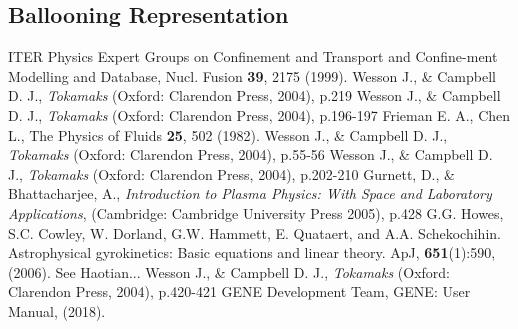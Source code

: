 \documentclass[12pt]{article}
\numberwithin{equation}{subsection}
\begin{document}
\subsection{Ballooning Representation}

\newpage{}

\begin{thebibliography}{0}
   
    ITER Physics Expert Groups on Confinement and Transport and Confine-ment Modelling and Database, Nucl. Fusion \textbf{39}, 2175 (1999).
    Wesson J., \& Campbell D. J., \textit{Tokamaks} (Oxford: Clarendon Press, 2004), p.219
    Wesson J., \& Campbell D. J., \textit{Tokamaks} (Oxford: Clarendon Press, 2004), p.196-197
    Frieman E. A., Chen L., The Physics of Fluids \textbf{25}, 502 (1982).
    Wesson J., \& Campbell D. J., \textit{Tokamaks} (Oxford: Clarendon Press, 2004), p.55-56
    Wesson J., \& Campbell D. J., \textit{Tokamaks} (Oxford: Clarendon Press, 2004), p.202-210
    Gurnett, D., \& Bhattacharjee, A., \textit{Introduction to Plasma Physics: With Space and Laboratory Applications},
                       (Cambridge: Cambridge University Press 2005), p.428
    G.G. Howes, S.C. Cowley, W. Dorland, G.W. Hammett, E. Quataert, and A.A. Schekochihin.
                         Astrophysical gyrokinetics: Basic equations and linear theory. ApJ, \textbf{651}(1):590, (2006).
    See Haotian...
    Wesson J., \& Campbell D. J., \textit{Tokamaks} (Oxford: Clarendon Press, 2004), p.420-421
    GENE Development Team, GENE: User Manual, (2018).

\end{thebibliography}
    
\end{document}
